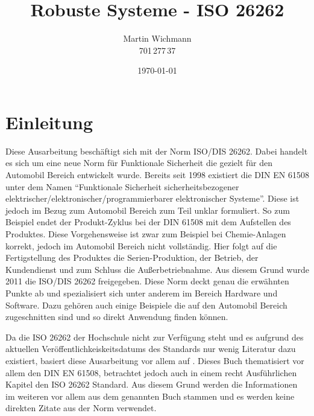 \documentclass[a4paper,DIV=calc,ngerman]{scrartcl}
\begin{document}
\titlehead{}
\title{Robuste Systeme - ISO 26262}
\author{Martin Wichmann\\701\,277\,37}
\date{\today}
\maketitle

\tableofcontents

\newpage

\section{Einleitung}
\label{sec:Einleitung}
Diese Ausarbeitung beschäftigt sich mit der Norm ISO/DIS 26262. Dabei handelt es sich um eine neue Norm für Funktionale Sicherheit die gezielt für den Automobil Bereich entwickelt wurde. Bereits seit 1998 existiert die DIN EN 61508 unter dem Namen "`Funktionale Sicherheit sicherheitsbezogener elektrischer/elektronischer/programmierbarer elektronischer Systeme"'. Diese ist jedoch im Bezug zum Automobil Bereich zum Teil unklar formuliert. So zum Beispiel endet der Produkt-Zyklus bei der DIN 61508 mit dem Aufstellen des Produktes. Diese Vorgehensweise ist zwar zum Beispiel bei Chemie-Anlagen korrekt, jedoch im Automobil Bereich nicht vollständig. Hier folgt auf die Fertigstellung des Produktes die Serien-Produktion, der Betrieb, der Kundendienst und zum Schluss die Außerbetriebnahme. Aus diesem Grund wurde 2011 die ISO/DIS 26262 freigegeben. Diese Norm deckt genau die erwähnten Punkte ab und spezialisiert sich unter anderem im Bereich Hardware und Software. Dazu gehören auch einige Beispiele die auf den Automobil Bereich zugeschnitten sind und so direkt Anwendung finden können.

Da die ISO 26262 der Hochschule nicht zur Verfügung steht und es aufgrund des aktuellen Veröffentlichkeiskeitsdatums des Standards nur wenig Literatur dazu existiert, basiert diese Ausarbeitung vor allem auf \cite{1}. Dieses Buch thematisiert vor allem den DIN EN 61508, betrachtet jedoch auch in einem recht Ausführlichen Kapitel den ISO 26262 Standard. Aus diesem Grund werden die Informationen im weiteren vor allem aus dem genannten Buch stammen und es werden keine direkten Zitate aus der Norm verwendet.
\end{document}
